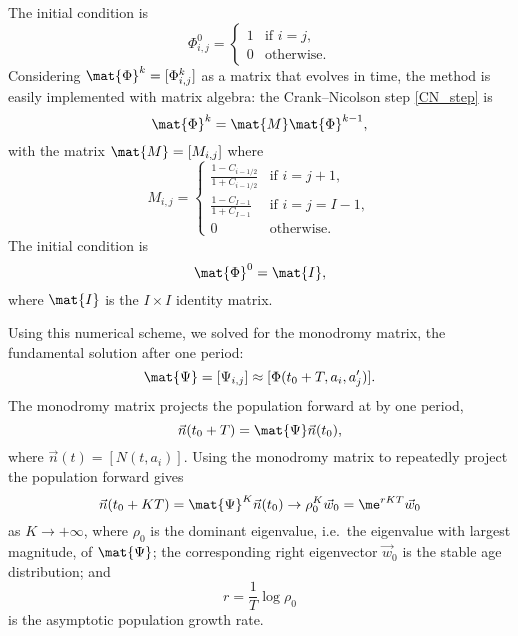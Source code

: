 \documentclass{jpmarticle}
\begin{document}
The initial condition is
\begin{equation}
  \Phi_{i, j}^0 =
  \begin{cases}
    1 & \text{if $i = j$}, \\
    0 & \text{otherwise}.
  \end{cases}
\end{equation}
Considering $\mat{\Phi}^k = [\Phi_{i, j}^k]$ as a matrix that
evolves in time, the method is easily implemented with matrix algebra:
the Crank--Nicolson step \eqref{CN_step} is
\begin{equation}
  \mat{\Phi}^k = \mat{M} \mat{\Phi}^{k - 1},
\end{equation}
with the matrix $\mat{M} = [M_{i, j}]$ where
\begin{equation}
  M_{i, j} =
  \begin{cases}
    \frac{1 - C_{i - 1 / 2}}{1 + C_{i - 1 / 2}}
    & \text{if $i = j + 1$}, \\
    \frac{1 - C_{I - 1}}{1 + C_{I - 1}} & \text{if $i = j = I - 1$}, \\
    0 & \text{otherwise}.
  \end{cases}
\end{equation}
The initial condition is
\begin{equation}
  \mat{\Phi}^0 = \mat{I},
\end{equation}
where $\mat{I}$ is the $I \times I$ identity matrix.

Using this numerical scheme, we solved for the monodromy matrix, the
fundamental solution after one period:
\begin{equation}
  \mat{\Psi} = [\Psi_{i, j}] \approx [\Phi(t_0 + T, a_i, a'_j)].
\end{equation}
The monodromy matrix projects the population forward at by one period,
\begin{equation}
  \vec{n}(t_0 + T) = \mat{\Psi} \vec{n}(t_0),
\end{equation}
where $\vec{n}(t) = [N(t, a_i)]$.
Using the monodromy matrix to repeatedly project the population
forward gives
\begin{equation}
  \vec{n}(t_0 + K T)
  = \mat{\Psi}^K \vec{n}(t_0)
  \to \rho_0^K \vec{w}_0
  = \me^{r K T} \vec{w}_0
\end{equation}
as $K \to +\infty$,
where $\rho_0$ is the dominant eigenvalue, i.e.~the eigenvalue with
largest magnitude, of $\mat{\Psi}$;
the corresponding right eigenvector $\vec{w}_0$ is the stable age
distribution; and
\begin{equation}
  r = \frac{1}{T} \log \rho_0
\end{equation}
is the asymptotic population growth rate.
\end{document}
